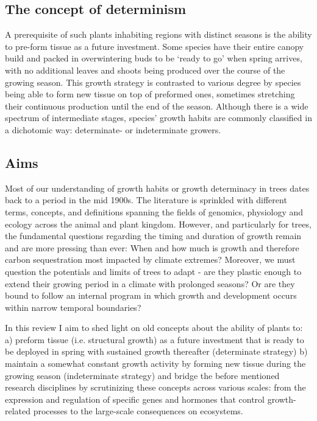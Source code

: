 \documentclass{article}
\begin{document}
	\subsection*{The concept of determinism}
	A prerequisite of such plants inhabiting regions with distinct seasons is the ability to pre-form tissue as a future investment. Some species have their entire canopy build and packed in overwintering buds to be ‘ready to go’ when spring arrives, with no additional leaves and shoots being produced over the course of the growing season. This growth strategy is contrasted to various degree by species being able to form new tissue on top of preformed ones, sometimes stretching their continuous production until the end of the season. Although there is a wide spectrum of intermediate stages, species’ growth habits are commonly classified in a dichotomic way: determinate- or indeterminate growers.
	\subsection*{Aims}
	Most of our understanding of growth habits or growth determinacy in trees dates back to a period in the mid 1900s. The literature is sprinkled with different terms, concepts, and definitions spanning the fields of genomics, physiology and ecology across the animal and plant kingdom. However, and particularly for trees, the fundamental questions regarding the timing and duration of growth remain and are more pressing than ever: When and how much is growth and therefore carbon sequestration most impacted by climate extremes? Moreover, we must question the potentials and limits of trees to adapt - are they plastic enough to extend their growing period in a climate with prolonged seasons? Or are they bound to follow an internal program in which growth and development occurs within narrow temporal boundaries?
	
	In this review I aim to shed light on old concepts about the ability of plants to:
	a) preform tissue (i.e. structural growth) as a future investment that is ready to be deployed in spring with sustained growth thereafter (determinate strategy)
	b) maintain a somewhat constant growth activity by forming new tissue during the growing season (indeterminate strategy)
	and bridge the before mentioned research disciplines by scrutinizing these concepts across various scales: from the expression and regulation of specific genes and hormones that control growth-related processes to the large-scale consequences on ecosystems. 
	\\
\end{document}
